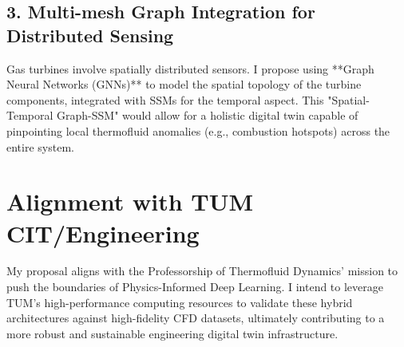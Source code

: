 \documentclass[11pt,a4paper]{article}
\begin{document}
\subsection{3. Multi-mesh Graph Integration for Distributed Sensing}
Gas turbines involve spatially distributed sensors. I propose using **Graph Neural Networks (GNNs)** to model the spatial topology of the turbine components, integrated with SSMs for the temporal aspect. This "Spatial-Temporal Graph-SSM" would allow for a holistic digital twin capable of pinpointing local thermofluid anomalies (e.g., combustion hotspots) across the entire system.

\section{Alignment with TUM CIT/Engineering}
My proposal aligns with the Professorship of Thermofluid Dynamics' mission to push the boundaries of Physics-Informed Deep Learning. I intend to leverage TUM’s high-performance computing resources to validate these hybrid architectures against high-fidelity CFD datasets, ultimately contributing to a more robust and sustainable engineering digital twin infrastructure.
\end{document}
